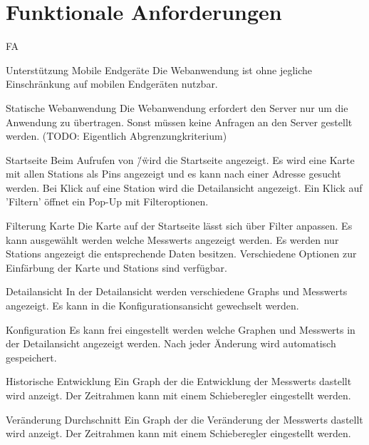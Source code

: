 \section{Funktionale Anforderungen}

\begin{Kriterien}{FA}

 \item[Unterstützung Mobile Endgeräte]
   Die Webanwendung ist ohne jegliche Einschränkung auf mobilen Endgeräten nutzbar.  

 \item[Statische Webanwendung]
   Die Webanwendung erfordert den Server nur um die Anwendung zu übertragen.
   Sonst müssen keine Anfragen an den Server gestellt werden. (TODO: Eigentlich Abgrenzungkriterium)

 \item[Startseite]
   Beim Aufrufen von \"/\" wird die Startseite angezeigt.
   Es wird eine Karte mit allen \glspl{Station} als \glspl{Pin} angezeigt und es kann nach einer Adresse gesucht werden.
   Bei Klick auf eine Station wird die Detailansicht angezeigt.
   Ein Klick auf 'Filtern' öffnet ein \gls{Pop-Up} mit Filteroptionen.

 \item[Filterung Karte]
   Die Karte auf der Startseite lässt sich über Filter anpassen.
   Es kann ausgewählt werden welche \glspl{Messwert} angezeigt werden.
   Es werden nur \glspl{Station} angezeigt die entsprechende Daten besitzen.
   Verschiedene Optionen zur Einfärbung der Karte und \glspl{Station} sind verfügbar.

 \item[Detailansicht]
   In der Detailansicht werden verschiedene \glspl{Graph} und \glspl{Messwert} angezeigt.
   Es kann in die Konfigurationsansicht gewechselt werden.

 \item[Konfiguration]
   Es kann frei eingestellt werden welche Graphen und \glspl{Messwert} in der Detailansicht angezeigt werden.
   Nach jeder Änderung wird automatisch gespeichert. 

 \item[Historische Entwicklung]
   Ein Graph der die Entwicklung der \glspl{Messwert} dastellt wird anzeigt.
   Der Zeitrahmen kann mit einem Schieberegler eingestellt werden.
 
 \item[Veränderung Durchschnitt]
   Ein Graph der die Veränderung der \glspl{Messwert} dastellt wird anzeigt.
   Der Zeitrahmen kann mit einem Schieberegler eingestellt werden.


\end{Kriterien}

